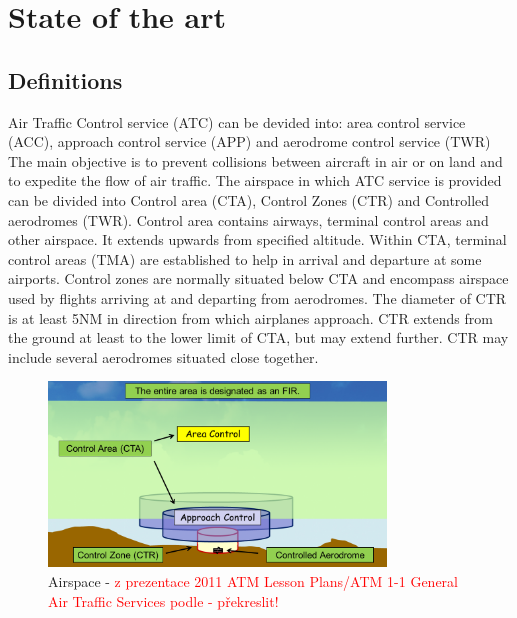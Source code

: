\chapter{State of the art}
\section{Definitions}

Air Traffic Control service (ATC) can be devided into: area control service (ACC), approach control service (APP) and aerodrome control service (TWR) \cite[Chapter 1]{ICAO2007} The main objective is to prevent collisions between aircraft in air or on land and to expedite the flow of air traffic. \cite[Chapter 2.2]{annex11}
The airspace in which ATC service is provided can be divided into Control area (CTA), Control Zones (CTR) and Controlled aerodromes (TWR). Control area contains airways, terminal control areas and other airspace. It extends upwards from specified altitude. Within CTA, terminal control areas (TMA) are established to help in arrival and departure at some airports.
Control zones are normally situated below CTA and encompass airspace used by flights arriving at and departing from aerodromes. The diameter of CTR is at least 5NM in direction from which airplanes approach. CTR extends from the ground at least to the lower limit of CTA, but may extend further. CTR may include several aerodromes situated close together. \cite[Chapter 2.10]{annex11}

\begin{figure}[h]
    \centering
    \includegraphics[width=0.8\textwidth]{figures/airspace.png}
    \caption{Airspace - \textcolor{red}{z prezentace 2011 ATM Lesson Plans/ATM 1-1 General Air Traffic Services podle \cite[Chapter 2.5]{annex11} - překreslit!}}
    \label{fig:airspace}
\end{figure}

